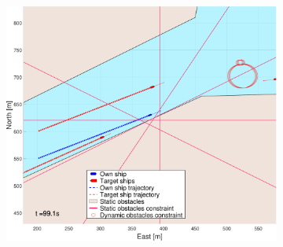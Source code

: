 

\begin{figure}[!ht] %
    \begin{subfigure}[b]{0.494\textwidth}
        \centering
        \includegraphics[width=\textwidth]{Images/NewFigures/Trheimfjord/_Simple_0fig1_time=100}
        \subcaption{}
    \end{subfigure}
    \hfill
    \begin{subfigure}[b]{0.494\textwidth}
        \centering

\end{subfigure}
\end{figure}
